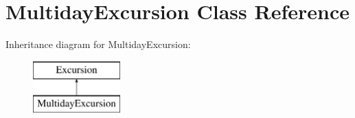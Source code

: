 \hypertarget{class_multiday_excursion}{}\section{Multiday\+Excursion Class Reference}
\label{class_multiday_excursion}
Inheritance diagram for Multiday\+Excursion\+:\begin{figure}[H]
\begin{center}
\leavevmode
\includegraphics[height=2.000000cm]{class_multiday_excursion}
\end{center}
\end{figure}
